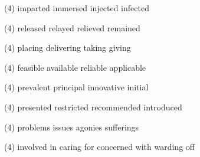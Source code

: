 \begin{tasks}(4)
	\task imparted
	\task immersed
	\task injected
	\task infected
\end{tasks}
\item
\begin{tasks}(4)
	\task released
	\task relayed
	\task relieved
	\task remained
\end{tasks}
\item
\begin{tasks}(4)
	\task placing
	\task delivering
	\task taking
	\task giving
\end{tasks}
\item
\begin{tasks}(4)
	\task feasible
	\task available
	\task reliable
	\task applicable
\end{tasks}
\item
\begin{tasks}(4)
	\task prevalent
	\task principal
	\task innovative
	\task initial
\end{tasks}
\item
\begin{tasks}(4)
	\task presented
	\task restricted
	\task recommended
	\task introduced
\end{tasks}
\item
\begin{tasks}(4)
	\task problems
	\task issues
	\task agonies
	\task sufferings
\end{tasks}
\item
\begin{tasks}(4)
	\task involved in
	\task caring for
	\task concerned with
	\task warding off
\end{tasks}
